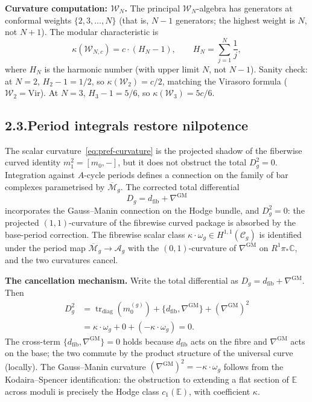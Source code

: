 \documentclass[11pt,reqno]{amsart}
\theoremstyle{definition}
\theoremstyle{remark}
\providecommand{\cW}{\mathcal{W}}
\providecommand{\GM}{\mathrm{GM}}
\numberwithin{equation}{section}
\begin{document}
\medskip
\noindent\textbf{Curvature computation: $\cW_N$.}\enspace
The principal $\cW_N$-algebra has generators at conformal weights
$\{2,3,\ldots,N\}$ (that is, $N-1$ generators; the highest weight
is $N$, not $N+1$). The modular characteristic is
\[
\kappa(\cW_{N,c})=c\cdot(H_N-1),\qquad H_N=\sum_{j=1}^N\frac{1}{j},
\]
where $H_N$ is the harmonic number (with upper limit $N$, not $N-1$).
Sanity check: at $N=2$, $H_2-1=1/2$, so $\kappa(\cW_2)=c/2$,
matching the Virasoro formula ($\cW_2=\mathrm{Vir}$). At $N=3$,
$H_3-1=5/6$, so $\kappa(\cW_3)=5c/6$.

\subsection*{2.3.\enspace Period integrals restore nilpotence}

The scalar curvature~\eqref{eq:pref-curvature} is the projected shadow
of the fiberwise curved identity $m_1^2=[m_0,-]$, but it does not
obstruct the total $D_g^2=0$. Integration against $A$-cycle periods
defines a connection on the family of bar complexes parametrised by
$\overline{\mathcal M}_g$. The corrected total differential
\[
D_g=d_{\mathrm{fib}}+\nabla^{\mathrm{GM}}
\]
incorporates the Gauss--Manin connection on the Hodge bundle, and
$D_g^2=0$: the projected $(1,1)$-curvature of the fibrewise curved
package is absorbed by the base-period correction. The fibrewise
scalar class $\kappa\cdot\omega_g\in H^{1,1}(\mathcal C_g)$ is identified
under the period map $\overline{\mathcal M}_g\to\mathcal A_g$ with
the $(0,1)$-curvature of $\nabla^{\mathrm{GM}}$ on $R^1\pi_*\mathbb C$,
and the two curvatures cancel.

\medskip
\noindent\textbf{The cancellation mechanism.}\enspace
Write the total differential as $D_g=d_{\mathrm{fib}}+\nabla^{\GM}$.
Then
\begin{align*}
D_g^2&=\operatorname{tr}_{\mathrm{diag}}(m_0^{(g)})+\{d_{\mathrm{fib}},\nabla^{\GM}\}+(\nabla^{\GM})^2\\
&=\kappa\cdot\omega_g+0+(-\kappa\cdot\omega_g)=0.
\end{align*}
The cross-term $\{d_{\mathrm{fib}},\nabla^{\GM}\}=0$ holds because
$d_{\mathrm{fib}}$ acts on the fibre and $\nabla^{\GM}$ acts on the
base; the two commute by the product structure of the universal curve
(locally). The Gauss--Manin curvature $(\nabla^{\GM})^2=-\kappa\cdot\omega_g$
follows from the Kodaira--Spencer identification: the obstruction
to extending a flat section of $\mathbb E$ across moduli is precisely
the Hodge class $c_1(\mathbb E)$, with coefficient $\kappa$.
\end{document}
